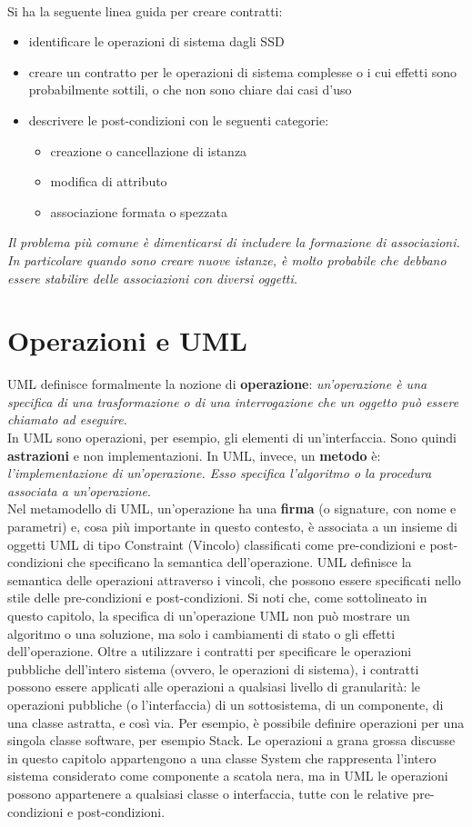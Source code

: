 \documentclass[a4paper,12pt, oneside]{book}
\begin{document}
\\
Si ha la seguente linea guida per creare contratti:
\begin{itemize}
	\item identificare le operazioni di sistema dagli SSD
	\item creare un contratto per le operazioni di sistema complesse o i cui effetti sono probabilmente sottili, o che non sono chiare dai casi d'uso
	\item descrivere le post-condizioni con le seguenti categorie:
	\begin{itemize}
		\item creazione o cancellazione di istanza
		\item modifica di attributo
		\item associazione formata o spezzata
	\end{itemize}
\end{itemize}
\textit{Il problema più comune è dimenticarsi di includere la formazione di associazioni. In particolare quando sono creare nuove istanze, è molto probabile che debbano essere stabilire delle associazioni con diversi oggetti.}\\
\section{Operazioni e UML}
UML definisce formalmente la nozione di \textbf{operazione}: \textit{un'operazione è una specifica di una trasformazione o di una interrogazione che un oggetto può essere chiamato ad eseguire.}\\
In UML sono operazioni, per esempio, gli elementi di un'interfaccia. Sono quindi \textbf{astrazioni} e non implementazioni. In UML, invece, un \textbf{metodo} è:
\textit{l'implementazione di un'operazione. Esso specifica l'algoritmo o la procedura associata a un'operazione}.\\
Nel metamodello di UML, un'operazione ha una \textbf{firma} (o signature, con nome e parametri) e, cosa più importante in questo contesto, è associata a un insieme di oggetti UML di tipo Constraint (Vincolo) classificati come pre-condizioni e post-condizioni che specificano la semantica dell'operazione.
UML definisce la semantica delle operazioni attraverso i vincoli, che possono essere specificati nello stile delle pre-condizioni e post-condizioni. Si noti che, come sottolineato in questo capitolo, la specifica di un'operazione UML non può mostrare un algoritmo o una soluzione, ma solo i cambiamenti di stato o gli effetti dell'operazione. Oltre a utilizzare i contratti per specificare le operazioni pubbliche dell'intero sistema (ovvero, le operazioni di sistema), i contratti possono essere applicati alle operazioni a qualsiasi livello di granularità: le operazioni pubbliche (o l'interfaccia) di un sottosistema, di un componente, di una classe astratta, e così via. Per esempio, è possibile definire operazioni per una singola classe software, per esempio Stack. Le operazioni a grana grossa discusse in questo capitolo appartengono a una classe System che rappresenta l'intero sistema considerato come componente a scatola nera, ma in UML le operazioni possono appartenere a qualsiasi classe o interfaccia, tutte con le relative pre-condizioni e post-condizioni.
\end{document}
